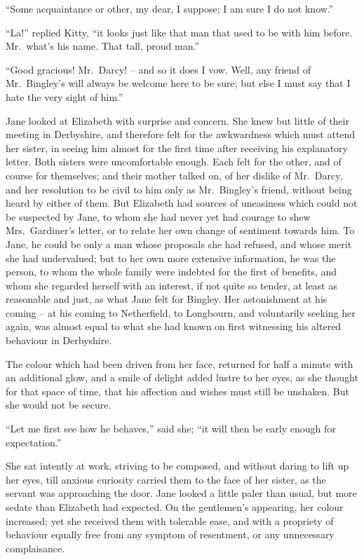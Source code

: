 “Some acquaintance or other, my dear, I suppose;
I am sure I do not know.”

“La!” replied Kitty, “it looks just like that man that
used to be with him before. Mr.\ what’s his name. That
tall, proud man.”

“Good gracious! Mr.\ Darcy! -- and so it does I vow.
Well, any friend of Mr.\ Bingley’s will always be welcome
here to be sure; but else I must say that I hate the very
sight of him.”

Jane looked at Elizabeth with surprise and concern.
She knew but little of their meeting in Derbyshire, and
therefore felt for the awkwardness which must attend
her sister, in seeing him almost for the first time after
receiving his explanatory letter. Both sisters were uncomfortable
enough. Each felt for the other, and of course
for themselves; and their mother talked on, of her dislike
of Mr.\ Darcy, and her resolution to be civil to him only
as Mr.\ Bingley’s friend, without being heard by either of
them. But Elizabeth had sources of uneasiness which
could not be suspected by Jane, to whom she had never
yet had courage to shew Mrs.\ Gardiner’s letter, or to
relate her own change of sentiment towards him. To
Jane, he could be only a man whose proposals she had
refused, and whose merit she had undervalued; but to
her own more extensive information, he was the person,
to whom the whole family were indebted for the first of
benefits, and whom she regarded herself with an interest,
if not quite so tender, at least as reasonable and just, as
what Jane felt for Bingley. Her astonishment at his
coming -- at his coming to Netherfield, to Longbourn, and
voluntarily seeking her again, was almost equal to what
she had known on first witnessing his altered behaviour
in Derbyshire.

The colour which had been driven from her face, returned
for half a minute with an additional glow, and a smile
of delight added lustre to her eyes, as she thought for that
space of time, that his affection and wishes must still be
unshaken. But she would not be secure.

“Let me first see how he behaves,” said she; “it will
then be early enough for expectation.”

She sat intently at work, striving to be composed, and
without daring to lift up her eyes, till anxious curiosity
carried them to the face of her sister, as the servant was
approaching the door. Jane looked a little paler than
usual, but more sedate than Elizabeth had expected.
On the gentlemen’s appearing, her colour increased; yet
she received them with tolerable ease, and with a propriety
of behaviour equally free from any symptom of
resentment, or any unnecessary complaisance.

